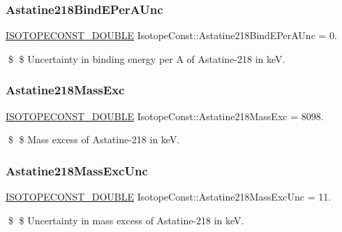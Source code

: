 \subsubsection{\texorpdfstring{Astatine218\+Bind\+E\+Per\+A\+Unc}{Astatine218BindEPerAUnc}}
{\footnotesize\ttfamily \mbox{\hyperlink{group___isotope_const-_macros_ga8f45a7272ce02c0b4c65c44636ed719a}{I\+S\+O\+T\+O\+P\+E\+C\+O\+N\+S\+T\+\_\+\+D\+O\+U\+B\+LE}} Isotope\+Const\+::\+Astatine218\+Bind\+E\+Per\+A\+Unc = 0.}

\$ \$ Uncertainty in binding energy per A of Astatine-\/218 in keV. \mbox{\label{group___isotope_const-_astatine-_at218_ga8fc9945d33ccda3f33222856645abfaf}} 
\subsubsection{\texorpdfstring{Astatine218\+Mass\+Exc}{Astatine218MassExc}}
{\footnotesize\ttfamily \mbox{\hyperlink{group___isotope_const-_macros_ga8f45a7272ce02c0b4c65c44636ed719a}{I\+S\+O\+T\+O\+P\+E\+C\+O\+N\+S\+T\+\_\+\+D\+O\+U\+B\+LE}} Isotope\+Const\+::\+Astatine218\+Mass\+Exc = 8098.}

\$ \$ Mass excess of Astatine-\/218 in keV. \mbox{\label{group___isotope_const-_astatine-_at218_gac8089e3d198fbbcdcf50284b07d26a70}} 
\subsubsection{\texorpdfstring{Astatine218\+Mass\+Exc\+Unc}{Astatine218MassExcUnc}}
{\footnotesize\ttfamily \mbox{\hyperlink{group___isotope_const-_macros_ga8f45a7272ce02c0b4c65c44636ed719a}{I\+S\+O\+T\+O\+P\+E\+C\+O\+N\+S\+T\+\_\+\+D\+O\+U\+B\+LE}} Isotope\+Const\+::\+Astatine218\+Mass\+Exc\+Unc = 11.}

\$ \$ Uncertainty in mass excess of Astatine-\/218 in keV. \mbox{\label{group___isotope_const-_astatine-_at218_gabe3dfccfe439c95866b018c59c39d19e}} 
